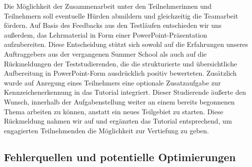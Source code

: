  Die Möglichkeit der Zusammenarbeit unter den Teilnehmerinnen und Teilnehmern soll eventuelle Hürden abmildern und gleichzeitig die Teamarbeit fördern.
Auf Basis des Feedbacks aus den Testläufen entschieden wir uns außerdem, das Lehrmaterial in Form einer PowerPoint-Präsentation aufzubereiten.
 Diese Entscheidung stützt sich sowohl auf die Erfahrungen unseres Auftraggebers aus der vergangenen Summer School als auch auf die Rückmeldungen der Teststudierenden, die die strukturierte und übersichtliche Aufbereitung in PowerPoint-Form ausdrücklich positiv bewerteten.
Zusätzlich wurde auf Anregung eines Teilnehmers eine optionale Zusatzaufgabe zur Kennzeichenerkennung in das Tutorial integriert.
 Dieser Studierende äußerte den Wunsch, innerhalb der Aufgabenstellung weiter an einem bereits begonnenen Thema arbeiten zu können, anstatt ein neues Teilgebiet zu starten.
 Diese Rückmeldung nahmen wir auf und ergänzten das Tutorial entsprechend, um engagierten Teilnehmenden die Möglichkeit zur Vertiefung zu geben.
\subsection{Fehlerquellen und potentielle Optimierungen}
